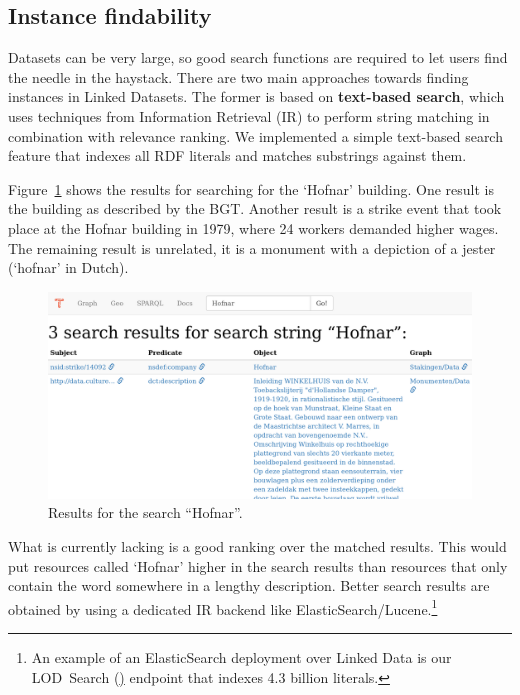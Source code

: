 \documentclass[a4paper]{scrartcl}
\begin{document}
\subsection{Instance findability}
\label{sec:instance_findability}

Datasets can be very large, so good search functions are required to
let users find the needle in the haystack.  There are two main
approaches towards finding instances in Linked Datasets.  The former
is based on \textbf{text-based search}, which uses techniques from
Information Retrieval (IR) to perform string matching in combination
with relevance ranking.  We implemented a simple text-based search
feature that indexes all RDF literals and matches substrings against
them.

Figure~\ref{fig:search} shows the results for searching for the
`Hofnar' building.  One result is the building as described by the
BGT.  Another result is a strike event that took place at the Hofnar
building in 1979, where 24 workers demanded higher wages.  The
remaining result is unrelated, it is a monument with a depiction of a
jester (`hofnar' in Dutch).

\begin{figure}
  \includegraphics[width=\linewidth]{img/search}
  \caption{Results for the search ``Hofnar''.}
  \label{fig:search}
\end{figure}

What is currently lacking is a good ranking over the matched results.
This would put resources called `Hofnar' higher in the search results
than resources that only contain the word somewhere in a lengthy
description.  Better search results are obtained by using a dedicated
IR backend like ElasticSearch/Lucene.\footnote{An example of an
  ElasticSearch deployment over Linked Data is our LOD~Search
  (\href{http://lodsearch.org}) endpoint that indexes 4.3 billion
  literals.}
\end{document}
